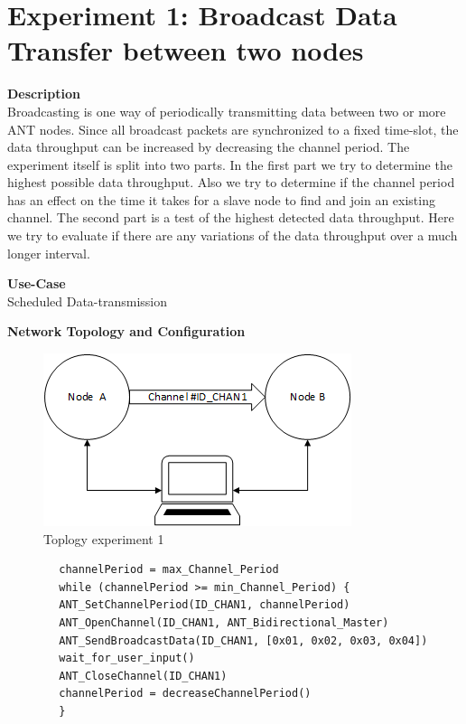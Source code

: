 \section{Experiment 1: Broadcast Data Transfer between two nodes}
\begin{description} 
	\item{\textbf{Description}} \hfill \\ Broadcasting is one way of periodically transmitting data between two or more ANT nodes. Since all broadcast packets are synchronized to a fixed time-slot, the data throughput can be increased by decreasing the channel period. The experiment itself is split into two parts. In the first part we try to determine the highest possible data throughput. Also we try to determine if the channel period has an effect on the time it takes for a slave node to find and join an existing channel. The second part is a test of the highest detected data throughput. Here we try to evaluate if there are any variations of the data throughput over a much longer interval.	
	\item{\textbf{Use-Case}} \hfill \\ Scheduled Data-transmission	
	\item{\textbf{Network Topology and Configuration}} \hfill \\ 
	\begin{figure}[H]
		\centering
		\includegraphics[scale=1]{content/images/exp_topo.png}
		\caption{Toplogy experiment 1}
	\end{figure}
	\begin{code}[H]
		\begin{verbatim}
		channelPeriod = max_Channel_Period
		while (channelPeriod >= min_Channel_Period) {
		ANT_SetChannelPeriod(ID_CHAN1, channelPeriod)
		ANT_OpenChannel(ID_CHAN1, ANT_Bidirectional_Master)
		ANT_SendBroadcastData(ID_CHAN1, [0x01, 0x02, 0x03, 0x04])
		wait_for_user_input()
		ANT_CloseChannel(ID_CHAN1)
		channelPeriod = decreaseChannelPeriod()
		}
		\end{verbatim}
		\caption{Broadcast data single channel (Master)}\label{lst:mExp1}
	\end{code}
	

\end{description}
